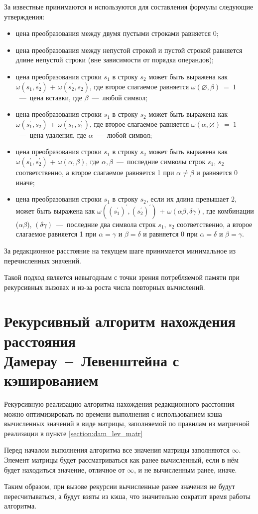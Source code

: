 За известные принимаются и используются для составления формулы следующие утверждения: \begin{itemize}
	\item цена преобразования между двумя пустыми строками равняется 0;
	\item цена преобразования между непустой строкой и пустой строкой равняется длине непустой строки (вне зависимости от порядка операндов);
	\item цена преобразования строки $s_1$ в строку $s_2$ может быть выражена как $\omega(s_1, s_2^{'})$ + $\omega(s_2^{'}, s_2)$, где второе слагаемое равняется $\omega(\varnothing,\beta)~=~1$~---~цена вставки, где $\beta$~---~любой символ;
	\item цена преобразования строки $s_1$ в строку $s_2$ может быть выражена как $\omega(s_1^{'}, s_2)$ + $\omega(s_1, s_1^{'})$, где второе слагаемое равняется $\omega(\alpha,\varnothing)~=~1$~---~цена удаления, где $\alpha$~---~любой символ;
	\item цена преобразования строки $s_1$ в строку $s_2$ может быть выражена как $\omega(s_1^{'}, s_2^{'})$ + $\omega(\alpha, \beta)$, где $\alpha, \beta$~---~последние символы строк $s_1$, $s_2$ соответственно, а второе слагаемое равняется 1 при $\alpha \neq \beta$ и равняется 0 иначе;
	\item цена преобразования строки $s_1$ в строку $s_2$, если их длина превышает 2, может быть выражена как $\omega((s_1^{'})^{'}, (s_2^{'})^{'})$ + $\omega(\alpha\beta, \delta\gamma)$, где комбинации ($\alpha\beta$), $(\delta\gamma)$~---~последние два символа строк $s_1$, $s_2$ соответственно, а второе слагаемое равняется 1 при $\alpha = \gamma$ и $\beta = \delta$ и равняется 0 при $\alpha = \delta$ и $\beta = \gamma$.
\end{itemize}

За редакционное расстояние на текущем шаге принимается минимальное из перечисленных значений.

Такой подход является невыгодным с точки зрения потребляемой памяти при рекурсивных вызовах и из-за роста числа повторных вычислений.

\section{Рекурсивный алгоритм нахождения расстояния \\ Дамерау~--~Левенштейна с кэшированием}
\label{section:dam_lev_cache}

Рекурсивную реализацию алгоритма нахождения редакционного расстояния можно оптимизировать по времени выполнения с использованием кэша вычисленных значений в виде матрицы, заполняемой по правилам из матричной реализации в пункте \ref{section:dam_lev_matr}

Перед началом выполнения алгоритма все значения матрицы заполняются $\infty$. Элемент матрицы будет рассматриваться как ранее вычисленный, если в нём будет находиться значение, отличное от $\infty$, и не вычисленным ранее, иначе.

Таким образом, при вызове рекурсии вычисленные ранее значения не будут пересчитываться, а будут взяты из кэша, что значительно сократит время работы алгоритма. 

\newpage
